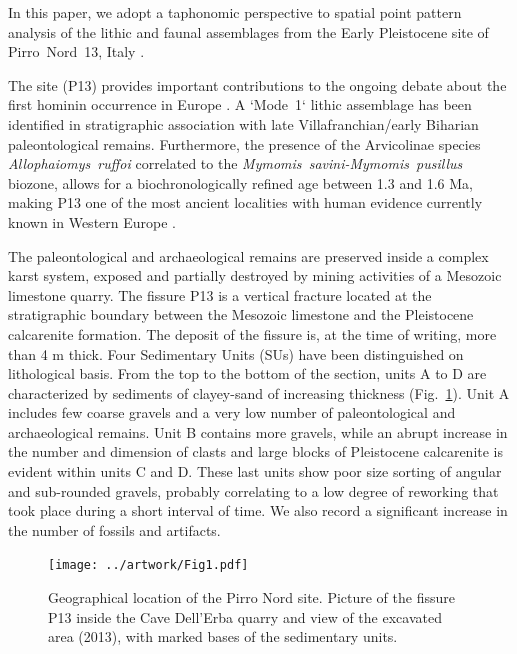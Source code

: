 \documentclass[review,authoryear]{elsarticle} %
\begin{document}
In this paper, we adopt a taphonomic perspective to spatial point pattern analysis of the lithic and faunal assemblages from the Early Pleistocene site of Pirro~Nord~13, Italy \citep{Arzarello2007,Arzarello2009,Arzarello2012,Arzarello2010}.

The site (P13) provides important contributions to the ongoing debate about the first hominin occurrence in Europe \citep{Carbonell2008,Crochet2009,Despriee2006,Despriee2009,Despriee2010,Lumley1988,Pares2006,Toro-Moyano2011,Toro-Moyano2009,Toro-Moyano2013}. A `Mode~1` lithic assemblage has been identified in stratigraphic association with late Villafranchian/early Biharian paleontological remains. Furthermore, the presence of the Arvicolinae species \emph{Allophaiomys~ruffoi} correlated to the \emph{Mymomis~savini-Mymomis~pusillus} biozone, allows for a  biochronologically refined age between 1.3 and 1.6 Ma, making P13 one of the most ancient localities with human evidence currently known in Western Europe \citep{Lopez-Garcia2015}.

The paleontological and archaeological remains are preserved inside a complex karst system, exposed and partially destroyed by mining activities of a Mesozoic limestone quarry. The fissure P13 is a vertical fracture located at the stratigraphic boundary between the Mesozoic limestone and the Pleistocene calcarenite formation. The deposit of the fissure is, at the time of writing, more than 4 m thick. Four Sedimentary Units (SUs) have been distinguished on lithological basis. From the top to the bottom of the section, units A to D are characterized by sediments of clayey-sand of increasing thickness (Fig.~\ref{fig:1}). Unit A includes few coarse gravels and a very low number of paleontological and archaeological remains. Unit B contains more gravels, while an abrupt increase in the number and dimension of clasts and large blocks of Pleistocene calcarenite is evident within units C and D. These last units show poor size sorting of angular and sub-rounded gravels, probably correlating to a low degree of reworking that took place during a short interval of time. We also record a significant increase in the number of fossils and artifacts.

\begin{figure}
  \centering
  \texttt{[image: ../artwork/Fig1.pdf]}
  \caption{Geographical location of the Pirro Nord site. Picture of the fissure P13 inside the Cave Dell'Erba quarry and view of the excavated area (2013), with marked bases of the sedimentary units.}
  \label{fig:1}
\end{figure}
\end{document}
